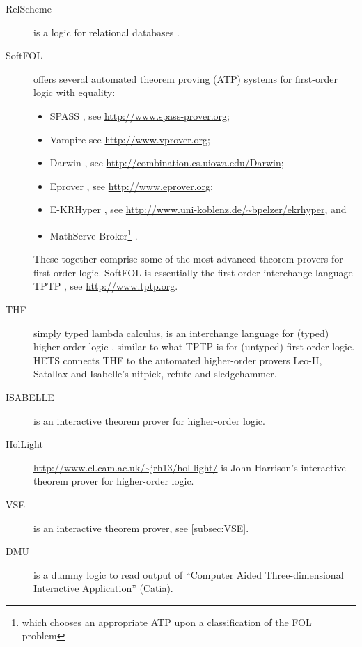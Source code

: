 \documentclass{article}
\newcommand{\normalTEXTSC}[2]{{#1\scriptsize#2}}
\newcommand     {\Hets}{\normalTEXTSC{H}{ETS}\xspace}
\newcommand     {\Isabelle}{\normalTEXTSC{I}{SABELLE}\xspace}
\newcommand     {\SPASS}{\normalTEXTSC{S}{PASS}\xspace}
\begin{document}
\begin{description}
\item[RelScheme] is a logic for relational databases \cite{DBLP:journals/ao/SchorlemmerK08}.

\item[SoftFOL] \cite{LuettichEA06a} offers several automated theorem
  proving (ATP) systems for first-order logic with equality:
\begin{itemize}
\item \SPASS
  \cite{WeidenbachEtAl02}, see \url{http://www.spass-prover.org};
\item Vampire \cite{RiazanovV02} see \url{http://www.vprover.org};
\item Darwin \cite{Baumgartner:etal:Darwin:IJAIT:2005}, see \url{http://combination.cs.uiowa.edu/Darwin};
\item Eprover \cite{Schulz:AICOM-2002}, see \url{http://www.eprover.org};
\item E-KRHyper \cite{DBLP:conf/cade/PelzerW07}, see \url{http://www.uni-koblenz.de/~bpelzer/ekrhyper}, and
\item
  MathServe Broker\footnote{which chooses an appropriate ATP upon a
    classification of the FOL problem} \cite{ZimmerAutexier06}.
\end{itemize}
  These together comprise some of the most advanced theorem provers
  for first-order logic. SoftFOL is essentially the first-order
  interchange language TPTP \cite{DBLP:conf/lpar/Sutcliffe10},
see \url{http://www.tptp.org}.

\item[THF] simply typed lambda calculus, is an interchange language for
  (typed) higher-order logic \cite{DBLP:conf/cade/BenzmullerRS08}, similar to
  what TPTP is for (untyped) first-order logic. \Hets connects THF to the
  automated higher-order provers Leo-II, Satallax and Isabelle's nitpick,
  refute and sledgehammer.

\item[\Isabelle] \cite{NipPauWen02} is an interactive theorem prover
  for higher-order logic.

\item[HolLight] \url{http://www.cl.cam.ac.uk/~jrh13/hol-light/}
  is John Harrison's interactive theorem prover
  for higher-order logic.

\item[VSE] is an interactive theorem prover, see \ref{subsec:VSE}.

\item[DMU] is a dummy logic to read output of ``Computer Aided
  Three-dimensional Interactive Application'' (Catia).


\end{description}
\end{document}
